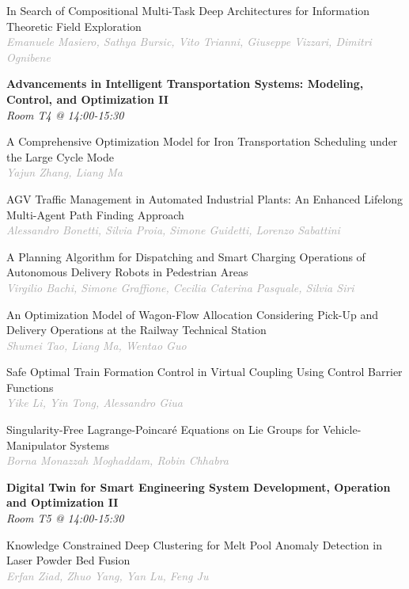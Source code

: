 \begin{multicols*}{2}
\small In Search of Compositional Multi-Task Deep Architectures for Information Theoretic Field Exploration\\ 
\footnotesize \textcolor{darkgray}{\textit{Emanuele Masiero, Sathya  Bursic, Vito  Trianni, Giuseppe  Vizzari, Dimitri  Ognibene}}

\normalsize \textbf{Advancements in Intelligent Transportation Systems: Modeling, Control, and Optimization II}\\
\small \textit{Room T4 @ 14:00-15:30}

\small A Comprehensive Optimization Model for Iron Transportation Scheduling under the Large Cycle Mode \\ 
\footnotesize \textcolor{darkgray}{\textit{Yajun Zhang, Liang  Ma}}

\small AGV Traffic Management in Automated Industrial Plants: An Enhanced Lifelong Multi-Agent Path Finding Approach\\ 
\footnotesize \textcolor{darkgray}{\textit{Alessandro Bonetti, Silvia  Proia, Simone  Guidetti, Lorenzo  Sabattini}}

\small A Planning Algorithm for Dispatching and Smart Charging Operations of Autonomous Delivery Robots in Pedestrian Areas\\ 
\footnotesize \textcolor{darkgray}{\textit{Virgilio Bachi, Simone  Graffione, Cecilia Caterina  Pasquale, Silvia  Siri}}

\small An Optimization Model of Wagon-Flow Allocation Considering Pick-Up and Delivery Operations at the Railway Technical Station\\ 
\footnotesize \textcolor{darkgray}{\textit{Shumei Tao, Liang  Ma, Wentao  Guo}}

\small Safe Optimal Train Formation Control in Virtual Coupling Using Control Barrier Functions\\ 
\footnotesize \textcolor{darkgray}{\textit{Yike Li, Yin  Tong, Alessandro  Giua}}

\small Singularity-Free Lagrange-Poincaré Equations on Lie Groups for Vehicle-Manipulator Systems\\ 
\footnotesize \textcolor{darkgray}{\textit{Borna Monazzah Moghaddam, Robin  Chhabra}}

\normalsize \textbf{Digital Twin for Smart Engineering System Development, Operation and Optimization II}\\
\small \textit{Room T5 @ 14:00-15:30}

\small Knowledge Constrained Deep Clustering for Melt Pool Anomaly Detection in Laser Powder Bed Fusion\\ 
\footnotesize \textcolor{darkgray}{\textit{Erfan Ziad, Zhuo  Yang, Yan  Lu, Feng  Ju}}


\end{multicols*}
